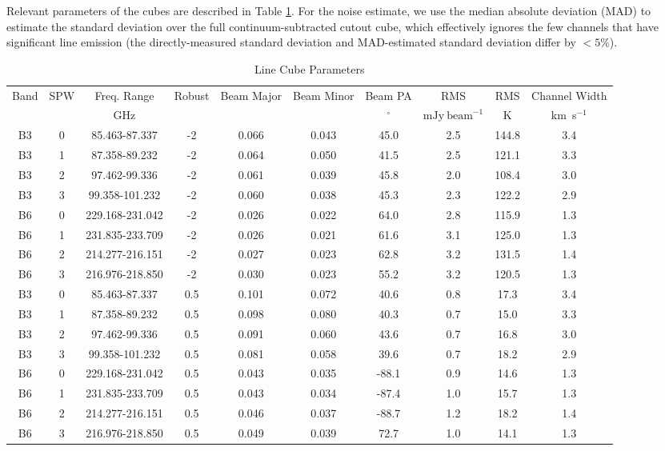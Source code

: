 \documentclass[twocolumn]{aastex61}
\let\oldarcsec\arcsec
\renewcommand\arcsec{\oldarcsec\xspace}%
\newcommand{\kms}{\textrm{km~s}\ensuremath{^{-1}}\xspace}	%
\begin{document}
Relevant parameters of the cubes are described in Table \ref{tab:cube_metadata}.
For the noise estimate, we use the median absolute deviation (MAD) to estimate the
standard deviation over the full continuum-subtracted cutout cube, which
effectively ignores the few channels that have significant line emission (the
directly-measured standard deviation and MAD-estimated standard deviation
differ by $<5\%$).


\begin{table}[htp]
\centering
\caption{Line Cube Parameters}
\begin{tabular}{cccccccccc}
\label{tab:cube_metadata}
Band & SPW & Freq. Range & Robust & Beam Major & Beam Minor & Beam PA               & RMS                               & RMS & Channel Width\\
     &     & GHz         &        & \arcsec    & \arcsec    & $\mathrm{{}^{\circ}}$ & $\mathrm{mJy}~\mathrm{beam}^{-1}$ & K   & \kms         \\
\hline

B3 & 0 & 85.463-87.337 & -2 & 0.066 & 0.043 & 45.0 & 2.5 & 144.8 & 3.4\\
B3 & 1 & 87.358-89.232 & -2 & 0.064 & 0.050 & 41.5 & 2.5 & 121.1 & 3.3\\
B3 & 2 & 97.462-99.336 & -2 & 0.061 & 0.039 & 45.8 & 2.0 & 108.4 & 3.0\\
B3 & 3 & 99.358-101.232 & -2 & 0.060 & 0.038 & 45.3 & 2.3 & 122.2 & 2.9\\
B6 & 0 & 229.168-231.042 & -2 & 0.026 & 0.022 & 64.0 & 2.8 & 115.9 & 1.3\\
B6 & 1 & 231.835-233.709 & -2 & 0.026 & 0.021 & 61.6 & 3.1 & 125.0 & 1.3\\
B6 & 2 & 214.277-216.151 & -2 & 0.027 & 0.023 & 62.8 & 3.2 & 131.5 & 1.4\\
B6 & 3 & 216.976-218.850 & -2 & 0.030 & 0.023 & 55.2 & 3.2 & 120.5 & 1.3\\
B3 & 0 & 85.463-87.337 & 0.5 & 0.101 & 0.072 & 40.6 & 0.8 & 17.3 & 3.4\\
B3 & 1 & 87.358-89.232 & 0.5 & 0.098 & 0.080 & 40.3 & 0.7 & 15.0 & 3.3\\
B3 & 2 & 97.462-99.336 & 0.5 & 0.091 & 0.060 & 43.6 & 0.7 & 16.8 & 3.0\\
B3 & 3 & 99.358-101.232 & 0.5 & 0.081 & 0.058 & 39.6 & 0.7 & 18.2 & 2.9\\
B6 & 0 & 229.168-231.042 & 0.5 & 0.043 & 0.035 & -88.1 & 0.9 & 14.6 & 1.3\\
B6 & 1 & 231.835-233.709 & 0.5 & 0.043 & 0.034 & -87.4 & 1.0 & 15.7 & 1.3\\
B6 & 2 & 214.277-216.151 & 0.5 & 0.046 & 0.037 & -88.7 & 1.2 & 18.2 & 1.4\\
B6 & 3 & 216.976-218.850 & 0.5 & 0.049 & 0.039 & 72.7 & 1.0 & 14.1 & 1.3\\

\hline
\end{tabular}

\end{table}
 
\end{document}
